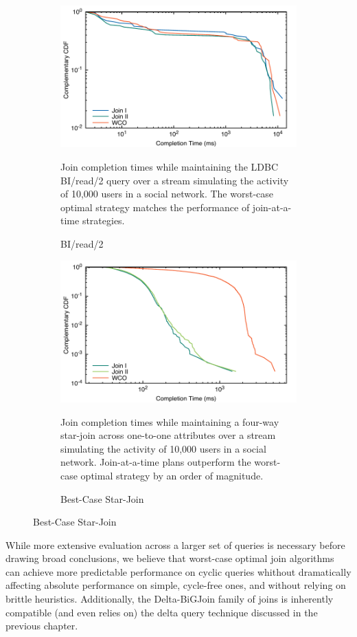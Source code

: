 \documentclass[../catalog.tex]{subfiles}
\begin{document}
\begin{figure}
  \begin{subfigure}{1.0\linewidth}
    \centering
    \includegraphics[width=1.0\linewidth]{results/bi_read_2/out/all_cdfs}
    \caption{BI/read/2}
    \label{fig:average-cdfs}
    \medskip
    \small

    Join completion times while maintaining the LDBC BI/read/2 query
    over a stream simulating the activity of 10,000 users in a social
    network. The worst-case optimal strategy matches the performance of
    join-at-a-time strategies.
  \end{subfigure}
  \begin{subfigure}{1.0\linewidth}
    \centering
    \includegraphics[width=1.0\linewidth]{results/best_case/out/all_cdfs}
    \caption{Best-Case Star-Join}
    \label{fig:best-case-cdfs}
    \medskip
    \small

    Join completion times while maintaining a four-way star-join across
    one-to-one attributes over a stream simulating the activity of
    10,000 users in a social network. Join-at-a-time plans outperform
    the worst-case optimal strategy by an order of magnitude.
  \end{subfigure}
\end{figure}

While more extensive evaluation across a larger set of queries is
necessary before drawing broad conclusions, we believe that worst-case
optimal join algorithms can achieve more predictable performance on
cyclic queries whithout dramatically affecting absolute performance on
simple, cycle-free ones, and without relying on brittle
heuristics. Additionally, the Delta-BiGJoin family of joins is
inherently compatible (and even relies on) the delta query technique
discussed in the previous chapter.
\end{document}
